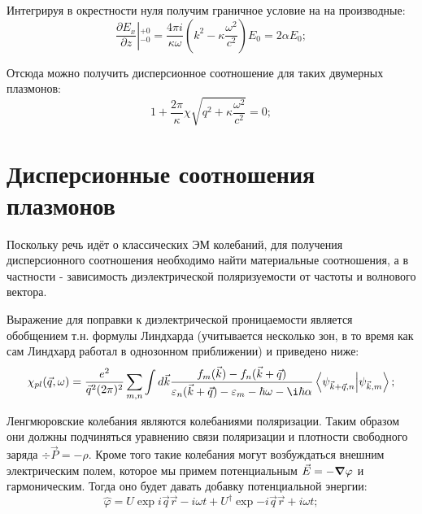 \documentclass[../main.tex]{subfiles}
\begin{document}
    Интегрируя в окрестности нуля получим граничное условие на на производные:
    \begin{equation*}
        \left.\frac{\partial E_x}{\partial z}\right\vert{}^{+0}_{-0} = \frac{4\pi i}{\kappa \omega}
        \left(k^2  - \kappa \frac{\omega^2}{c^2}\right) E_0 = 2 \alpha E_0;
    \end{equation*}

    Отсюда можно получить дисперсионное соотношение для таких двумерных плазмонов:
    \begin{equation}
        \label{plasmons:edisp}
        1 + \frac{2\pi}{\kappa} \chi \sqrt{q^2 + \kappa \frac{\omega^2}{c^2}} = 0;
    \end{equation}




    
    \section{Дисперсионные соотношения плазмонов}

    Поскольку речь идёт о классических ЭМ колебаний, 
    для получения дисперсионного соотношения необходимо найти 
    материальные соотношения, а в частности - зависимость 
    диэлектрической поляризуемости от частоты и волнового вектора.


    Выражение для поправки к диэлектрической проницаемости является 
    обобщением т.н. формулы Линдхарда (учитывается несколько зон, в то 
    время как сам Линдхард работал в однозонном приближении)
    и приведено ниже:
    \begin{equation}
        \label{lindhard}
        \chi_{pl}(\vec q, \omega) = \frac{e^2}{\vec{q}^2 (2\pi)^2}
            \sum_{m, n} \int d\vec k \frac{f_m(\vec k) - f_n(\vec k 
                + \vec q)}{\varepsilon_n(\vec k + \vec q) - 
                \varepsilon_m - \hbar \omega - \i \hbar \alpha}
                \bra{\psi_{\vec k + \vec q,n}} \ket{\psi_{\vec k, m}};
    \end{equation}


    Ленгмюровские колебания являются колебаниями поляризации. Таким
    образом они должны подчиняться уравнению связи поляризации и 
    плотности свободного заряда $\div \vec P  = - \rho$. Кроме того 
    такие колебания могут возбуждаться внешним электрическим полем, 
    которое мы примем потенциальным $\vec E = - \grad \varphi$ и 
    гармоническим. Тогда оно будет давать добавку потенциальной энергии:
    \begin{equation}
        \label{plazmon:field}
        \hat \varphi  = U \exp{i\vec q \vec r - i \omega t}
            + U^{\dagger} \exp{-i\vec q\vec r + i \omega t};
    \end{equation}
\end{document}
